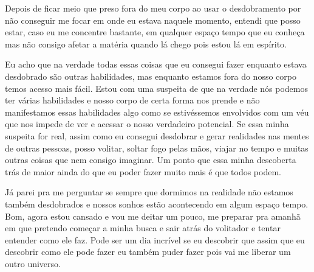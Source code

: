 Depois de ficar meio que preso fora do meu corpo ao usar o desdobramento por não conseguir me focar em onde eu estava naquele momento, entendi que posso estar, caso eu me concentre bastante, em qualquer espaço tempo que eu conheça mas não consigo afetar a matéria quando lá chego pois estou lá em espírito.

Eu acho que na verdade todas essas coisas que eu consegui fazer enquanto estava desdobrado são outras habilidades, mas enquanto estamos fora do nosso corpo temos acesso mais fácil. Estou com uma suspeita de que na verdade nós podemos ter várias habilidades e nosso corpo de certa forma nos prende e não manifestamos essas habilidades algo como se estivéssemos envolvidos com um véu que nos impede de ver e acessar o nosso verdadeiro potencial. Se essa minha suspeita for real, assim como eu consegui desdobrar e gerar realidades nas mentes de outras pessoas, posso volitar, soltar fogo pelas mãos, viajar no tempo e muitas outras coisas que nem consigo imaginar. Um ponto que essa minha descoberta trás de maior ainda do que eu poder fazer muito mais é que todos podem.

Já parei pra me perguntar se sempre que dormimos na realidade não estamos também desdobrados e nossos sonhos estão acontecendo em algum espaço tempo.
Bom, agora estou cansado e vou me deitar um pouco, me preparar pra amanhã em que pretendo começar a minha busca e sair atrás do volitador e tentar entender como ele faz. Pode ser um dia incrível se eu descobrir que assim que eu descobrir como ele pode fazer eu também puder fazer pois vai me liberar um outro universo.
